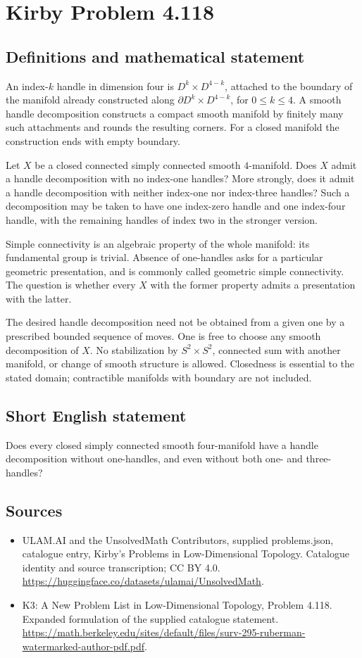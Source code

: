 \documentclass[11pt,a4paper]{article}
\begin{document}
\section*{Kirby Problem 4.118}\label{statement}

\subsection{Definitions and mathematical statement}
An index-$k$ handle in dimension four is $D^k\times D^{4-k}$,
attached to the boundary of the manifold already constructed along
$\partial D^k\times D^{4-k}$, for $0\le k\le4$.
A smooth handle decomposition constructs a compact smooth manifold
by finitely many such attachments and rounds the resulting corners.
For a closed manifold the construction ends with empty boundary.

Let $X$ be a closed connected simply connected smooth
$4$-manifold. Does $X$ admit a handle decomposition with no
index-one handles? More strongly, does it admit a handle
decomposition with neither index-one nor index-three handles?
Such a decomposition may be taken to have one index-zero handle
and one index-four handle, with the remaining handles of index two
in the stronger version.

Simple connectivity is an algebraic property of the whole manifold:
its fundamental group is trivial. Absence of one-handles asks for
a particular geometric presentation, and is commonly called geometric
simple connectivity. The question is whether every $X$ with the
former property admits a presentation with the latter.

The desired handle decomposition need not be obtained from a given
one by a prescribed bounded sequence of moves. One is free to
choose any smooth decomposition of $X$. No stabilization by
$S^2\times S^2$, connected sum with another manifold, or change
of smooth structure is allowed. Closedness is essential to the
stated domain; contractible manifolds with boundary are not included.
\subsection{Short English statement}
Does every closed simply connected smooth four-manifold have a handle decomposition without one-handles, and even without both one- and three-handles?
\subsection{Sources}
\begin{itemize}
\item[S1] ULAM.AI and the UnsolvedMath Contributors, supplied problems.json, catalogue entry, Kirby's Problems in Low-Dimensional Topology. Catalogue identity and source transcription; CC BY 4.0.
\url{https://huggingface.co/datasets/ulamai/UnsolvedMath}.
\item[S2] K3: A New Problem List in Low-Dimensional Topology, Problem 4.118. Expanded formulation of the supplied catalogue statement.
\url{https://math.berkeley.edu/sites/default/files/surv-295-ruberman-watermarked-author-pdf.pdf}.
\end{itemize}
\end{document}
